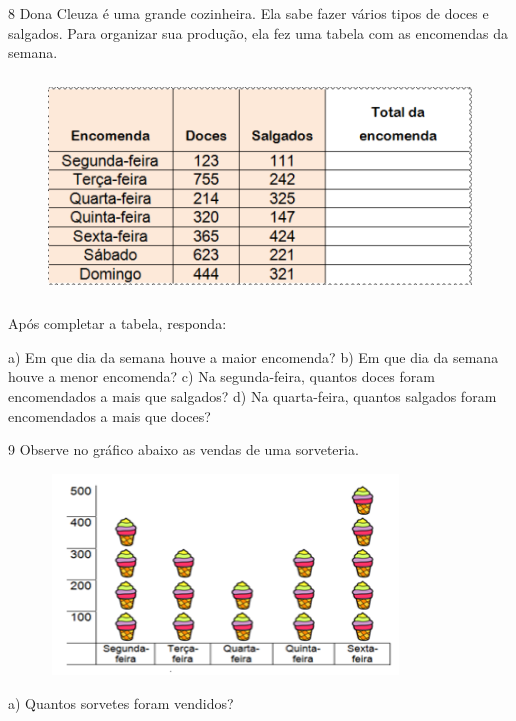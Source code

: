 {\num{8}  Dona Cleuza é uma grande cozinheira. Ela sabe fazer vários tipos de
doces e salgados. Para organizar sua produção, ela fez uma tabela com as
encomendas da semana.

\begin{figure}
\includegraphics[width=4.88403in,height=2.27917in]{./imgSAEB_6_MAT/media/image86.png}
\end{figure}

Após completar a tabela, responda:

\begin{escolha}
a) Em que dia da semana houve a maior encomenda? 
b) Em que dia da semana houve a menor encomenda? 
c) Na segunda-feira, quantos doces foram encomendados a mais que salgados? 
d) Na quarta-feira, quantos salgados foram encomendados a mais que doces? 
\end{escolha}

\num{9}  Observe no gráfico abaixo as vendas de uma sorveteria.

\begin{figure}
\includegraphics[width=3.7in,height=2.1in]{./imgSAEB_6_MAT/media/image87.png}
\end{figure}

a) Quantos sorvetes foram vendidos? 

}
